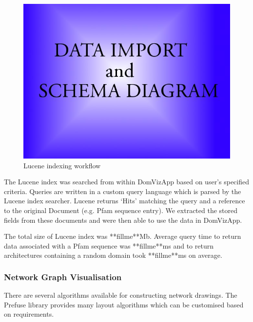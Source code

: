 \begin{figure}[h]
 \begin{center}
 \includegraphics[scale=0.5]{figures/placeholder.jpg}
 \end{center}
 \caption{Lucene indexing workflow}
 \label{luceneworkflow}
\end{figure}

The Lucene index was searched from within DomVizApp based on user's specified criteria. Queries are written in a custom query language which is parsed by the Lucene index searcher. Lucene returns `Hits' matching the query and a reference to the original Document (e.g. Pfam sequence entry). We extracted the stored fields from these documents and were then able to use the data in DomVizApp.   

The total size of Lucene index was **fillme**Mb. Average query time to return data associated with a Pfam sequence was **fillme**ms and to return architectures containing a random domain took **fillme**ms on average. 

\subsubsection{Network Graph Visualisation}
There are several algorithms available for constructing network drawings. The Prefuse library provides many layout algorithms which can be customised based on requirements. 

